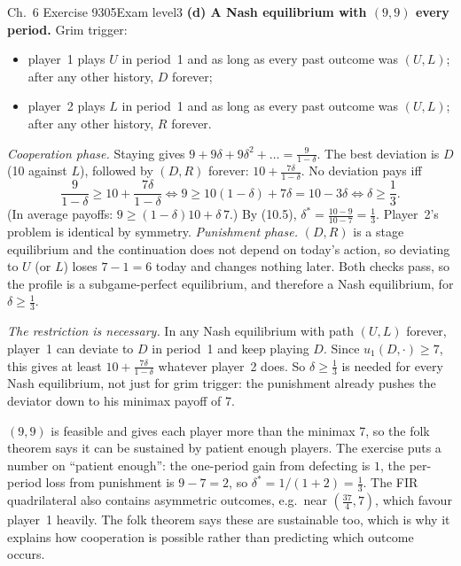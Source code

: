 \begin{exsol}{\MG{} Ch.~6 Exercise 9}{305}{Exam level}{3}
\textbf{(d) A Nash equilibrium with $(9,9)$ every period.} Grim trigger:
\begin{itemize}
  \item player~1 plays $U$ in period~1 and as long as every past outcome was $(U,L)$; after any other
  history, $D$ forever;
  \item player~2 plays $L$ in period~1 and as long as every past outcome was $(U,L)$; after any other
  history, $R$ forever.
\end{itemize}
\emph{Cooperation phase.} Staying gives $9 + 9\delta + 9\delta^2 + \dots = \frac{9}{1-\delta}$. The best
deviation is $D$ (10 against $L$), followed by $(D,R)$ forever:
$10 + \frac{7\delta}{1-\delta}$. No deviation pays iff
\[
  \frac{9}{1-\delta} \ge 10 + \frac{7\delta}{1-\delta}
  \iff 9 \ge 10(1-\delta) + 7\delta = 10 - 3\delta
  \iff \delta \ge \frac13 .
\]
(In average payoffs: $9 \ge (1-\delta)10 + \delta\, 7$.) By (10.5), $\delta^* = \frac{10-9}{10-7} =
\frac13$. Player~2's problem is identical by symmetry.
\emph{Punishment phase.} $(D,R)$ is a stage equilibrium and the continuation does not depend on
today's action, so deviating to $U$ (or $L$) loses $7 - 1 = 6$ today and changes nothing later. Both
checks pass, so the profile is a subgame-perfect equilibrium, and therefore a Nash equilibrium,
for $\delta \ge \frac13$.

\emph{The restriction is necessary.} In any Nash equilibrium with path $(U,L)$ forever, player~1 can
deviate to $D$ in period~1 and keep playing $D$. Since $u_1(D,\cdot)\ge 7$, this gives at least
$10 + \frac{7\delta}{1-\delta}$ whatever player~2 does. So $\delta \ge \frac13$ is needed for every
Nash equilibrium, not just for grim trigger: the punishment already pushes the deviator down to his
minimax payoff of 7.

\interp $(9,9)$ is feasible and gives each player more than the minimax 7, so the folk theorem says
it can be sustained by patient enough players. The exercise puts a number on ``patient enough'':
the one-period gain from defecting is $1$, the per-period loss from punishment is $9 - 7 = 2$, so
$\delta^* = 1/(1+2) = \frac13$. The FIR quadrilateral also contains asymmetric outcomes, e.g.\ near
$(\frac{37}{4}, 7)$, which favour player~1 heavily. The folk theorem says these are sustainable too,
which is why it explains how cooperation is possible rather than predicting which outcome occurs.


\end{exsol}
